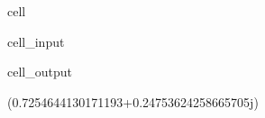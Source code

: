 \documentclass[letterpaper,10pt,english]{jupyterBook}
\begin{document}
\begin{sphinxuseclass}{cell}\begin{sphinxVerbatimInput}

\begin{sphinxuseclass}{cell_input}
\begin{sphinxVerbatim}[commandchars=\\\{\}]
  
  


\end{sphinxVerbatim}

\end{sphinxuseclass}\end{sphinxVerbatimInput}
\begin{sphinxVerbatimOutput}

\begin{sphinxuseclass}{cell_output}
\begin{sphinxVerbatim}[commandchars=\\\{\}]
(0.7254644130171193+0.24753624258665705j)
\end{sphinxVerbatim}

\end{sphinxuseclass}\end{sphinxVerbatimOutput}

\end{sphinxuseclass}
\end{document}
